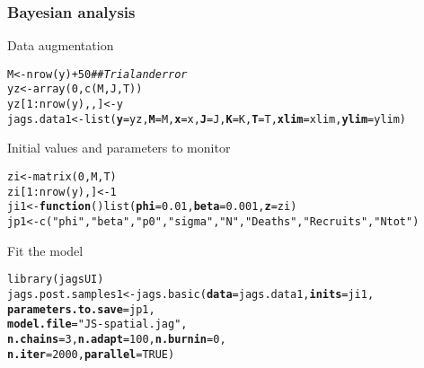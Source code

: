 \documentclass[color=usenames,dvipsnames]{beamer}\usepackage[]{graphicx}\usepackage[]{xcolor}
\makeatletter
\newcommand{\hlnum}[1]{\textcolor[rgb]{0.69,0.494,0}{#1}}%
\newcommand{\hlsng}[1]{\textcolor[rgb]{0.749,0.012,0.012}{#1}}%
\newcommand{\hlcom}[1]{\textcolor[rgb]{0.514,0.506,0.514}{\textit{#1}}}%
\newcommand{\hlopt}[1]{\textcolor[rgb]{0,0,0}{#1}}%
\newcommand{\hldef}[1]{\textcolor[rgb]{0,0,0}{#1}}%
\newcommand{\hlkwa}[1]{\textcolor[rgb]{0,0,0}{\textbf{#1}}}%
\newcommand{\hlkwb}[1]{\textcolor[rgb]{0,0.341,0.682}{#1}}%
\newcommand{\hlkwc}[1]{\textcolor[rgb]{0,0,0}{\textbf{#1}}}%
\newcommand{\hlkwd}[1]{\textcolor[rgb]{0.004,0.004,0.506}{#1}}%
\newenvironment{kframe}{%
 \def\at@end@of@kframe{}%
 \ifinner\ifhmode%
  \def\at@end@of@kframe{\end{minipage}}%
  \begin{minipage}{\columnwidth}%
 \fi\fi%
 \def\FrameCommand##1{\hskip\@totalleftmargin \hskip-\fboxsep
 \colorbox{shadecolor}{##1}\hskip-\fboxsep
     \hskip-\linewidth \hskip-\@totalleftmargin \hskip\columnwidth}%
 \MakeFramed {\advance\hsize-\width
   \@totalleftmargin\z@ \linewidth\hsize
   \@setminipage}}%
 {\par\unskip\endMakeFramed%
 \at@end@of@kframe}
\newenvironment{knitrout}{}{} %
\makeatother
\begin{document}
\begin{frame}[fragile]
  \frametitle{Bayesian analysis}
  {Data augmentation}
\begin{knitrout}\scriptsize
{}\color{fgcolor}\begin{kframe}
\begin{alltt}
\hldef{M} \hlkwb{<-} \hlkwd{nrow}\hldef{(y)} \hlopt{+} \hlnum{50}   \hlcom{## Trial and error}
\hldef{yz} \hlkwb{<-} \hlkwd{array}\hldef{(}\hlnum{0}\hldef{,} \hlkwd{c}\hldef{(M, J, T))}
\hldef{yz[}\hlnum{1}\hlopt{:}\hlkwd{nrow}\hldef{(y),,]} \hlkwb{<-} \hldef{y}
\hldef{jags.data1} \hlkwb{<-} \hlkwd{list}\hldef{(}\hlkwc{y}\hldef{=yz,} \hlkwc{M}\hldef{=M,} \hlkwc{x}\hldef{=x,} \hlkwc{J}\hldef{=J,} \hlkwc{K}\hldef{=K,} \hlkwc{T}\hldef{=T,} \hlkwc{xlim}\hldef{=xlim,} \hlkwc{ylim}\hldef{=ylim)}
\end{alltt}
\end{kframe}
\end{knitrout}
\pause
\vfill
  {\normalsize Initial values and parameters to monitor}
\begin{knitrout}\scriptsize
{}\color{fgcolor}\begin{kframe}
\begin{alltt}
\hldef{zi} \hlkwb{<-} \hlkwd{matrix}\hldef{(}\hlnum{0}\hldef{, M, T)}
\hldef{zi[}\hlnum{1}\hlopt{:}\hlkwd{nrow}\hldef{(y),]} \hlkwb{<-} \hlnum{1}
\hldef{ji1} \hlkwb{<-} \hlkwa{function}\hldef{()} \hlkwd{list}\hldef{(}\hlkwc{phi}\hldef{=}\hlnum{0.01}\hldef{,} \hlkwc{beta}\hldef{=}\hlnum{0.001}\hldef{,} \hlkwc{z}\hldef{=zi)}
\hldef{jp1} \hlkwb{<-} \hlkwd{c}\hldef{(}\hlsng{"phi"}\hldef{,} \hlsng{"beta"}\hldef{,} \hlsng{"p0"}\hldef{,} \hlsng{"sigma"}\hldef{,} \hlsng{"N"}\hldef{,} \hlsng{"Deaths"}\hldef{,} \hlsng{"Recruits"}\hldef{,} \hlsng{"Ntot"}\hldef{)}
\end{alltt}
\end{kframe}
\end{knitrout}
\pause
\vfill
  {\normalsize Fit the model}
\begin{knitrout}\scriptsize
{}\color{fgcolor}\begin{kframe}
\begin{alltt}
\hlkwd{library}\hldef{(jagsUI)}
\hldef{jags.post.samples1} \hlkwb{<-} \hlkwd{jags.basic}\hldef{(}\hlkwc{data}\hldef{=jags.data1,} \hlkwc{inits}\hldef{=ji1,}
                                 \hlkwc{parameters.to.save}\hldef{=jp1,}
                                 \hlkwc{model.file}\hldef{=}\hlsng{"JS-spatial.jag"}\hldef{,}
                                 \hlkwc{n.chains}\hldef{=}\hlnum{3}\hldef{,} \hlkwc{n.adapt}\hldef{=}\hlnum{100}\hldef{,} \hlkwc{n.burnin}\hldef{=}\hlnum{0}\hldef{,}
                                 \hlkwc{n.iter}\hldef{=}\hlnum{2000}\hldef{,} \hlkwc{parallel}\hldef{=}\hlnum{TRUE}\hldef{)}
\end{alltt}
\end{kframe}
\end{knitrout}
\end{frame}
\end{document}
